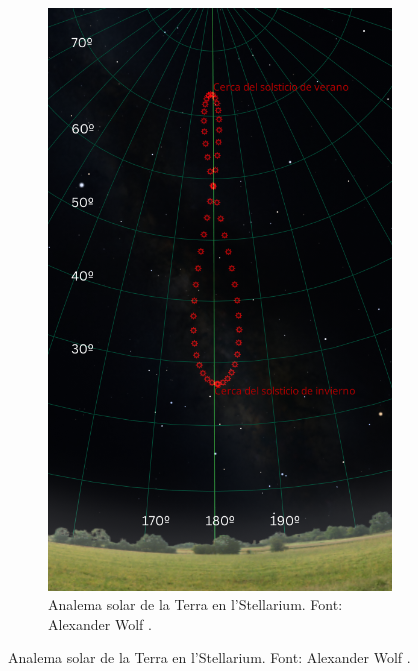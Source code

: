 \documentclass[a4paper, 11pt]{article}
\begin{document}
\begin{figure}[h!]
\begin{subfigure}{0.38\textwidth}
        \includegraphics[width=\textwidth]{images/analema_Terra_stellarium.png}
        \caption{Analema solar de la Terra en l'Stellarium. Font: Alexander Wolf \cite{SCRIPT_STELLARIUM}.}
    \end{subfigure}
\end{figure}

    \newpage
\end{document}
